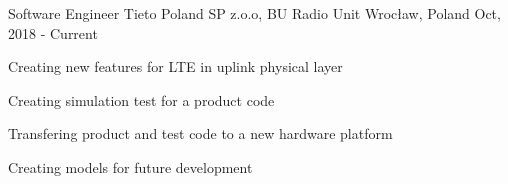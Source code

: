 \begin{cventries}
  \cventry
    {Software Engineer} %
    {Tieto Poland SP z.o.o, BU Radio Unit} %
    {Wrocław, Poland} %
    {Oct, 2018 - Current} %
    {
      \begin{cvitems}
        \item {Creating new features for LTE in uplink physical layer}
        \item {Creating simulation test for a product code}
        \item {Transfering product and test code to a new hardware platform}
        \item {Creating models for future development}
      \end{cvitems}
    }

\end{cventries}
